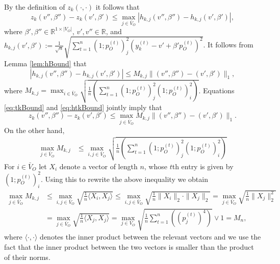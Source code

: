 \documentclass[opre,nonblindrev]{informs3} %
\begin{document}
\begin{APPENDIX}{}
By the definition of $z_k(\cdot,\cdot)$ it follows that
\begin{equation} \label{eq:tkBound}
z_k(v'',\beta'') - z_k(v',\beta') \leq
\max_{j\in \bar{V}_O}
\left|
h_{k,j}(v'',\beta'')
-h_{k,j}(v',\beta')\right|,
\end{equation}
where $\beta',\beta'' \in \mathbb{R}^{1\times |V_O|}$, $v',v''\in \mathbb{R}$, and 
$h_{k,j}(v',\beta'):=\frac{1}{\sqrt{n}}
\sqrt{\sum_{t=1}^n (1;p_O^{(t)})_j^2(y_k^{(t)}-v'+\beta'p_O^{(t)})^2}$.
It follows from Lemma \ref{lem:hBound} that
\begin{equation}\label{eq:htkBound}
\left|
h_{k,j}(v'',\beta'')
-h_{k,j}(v',\beta')\right| \leq
M_{k,j}
 \| (v'',\beta'')-(v',\beta') \|_1,
\end{equation}
where $M_{k,j}=
\max_{i\in \bar V_O} {\sqrt{\frac{1}{n} \left(\sum_{t=1}^n  (1;p_O^{(t)})_j^2 (1;p_O^{(t)})_i^2  \right) } }$.
Equations \eqref{eq:tkBound} and \eqref{eq:htkBound} jointly imply that
\begin{equation}\label{eq:tkBeforeFinal}
z_k(v'',\beta'') - z_k(v',\beta') \leq
\max_{j\in \bar{V}_O} M_{k,j}
\| (v'',\beta'')-(v',\beta') \|_1.
\end{equation}
On the other hand,
\begin{equation}
\begin{aligned}
\max_{j\in \bar{V}_O} M_{k,j} &\leq
\max_{i,j\in\bar{V}_O}
{\sqrt{\frac{1}{n} \left(\sum_{t=1}^n  (1;p_O^{(t)})_j^2 (1;p_O^{(t)})_i^2  \right) } }
\end{aligned}
\end{equation}
For $i\in \bar{V}_O$ let $X_i$ denote a vector of length $n$, whose $t$th entry is given by
$(1;p_O^{(t)})_i^2$. Using this to rewrite   the above inequality  we obtain
\begin{equation}
\begin{aligned}
\max_{j\in \bar{V}_O} M_{k,j} &\leq
\max_{i,j\in\bar{V}_O}
{\sqrt{\frac{1}{n}
		\langle X_i, X_j \rangle } }
	\leq
	\max_{i,j\in\bar{V}_O}
	{\sqrt{\frac{1}{n}
			\| X_i\|_2 \cdot \|X_j\|_2 }}
		=
			\max_{j\in\bar{V}_O}
		{\sqrt{\frac{1}{n}
				\| X_j\|_2^2 }}
	\\
&=
\max_{j\in \bar{V}_O}
{\sqrt{\frac{1}{n}
		\langle X_j, X_j \rangle } }
=
\max_{j\in V_O} {\sqrt{\frac{1}{n} \sum_{t=1}^n \left((p_j^{(t)})^4 \right) } }  \vee 1
=M_n,
\end{aligned}
\end{equation}
where
$\langle \cdot,\cdot \rangle$  denotes the inner product between the relevant vectors
and we use the fact that the inner product between the two vectors is smaller than the product of their norms.

\end{APPENDIX}
\end{document}
